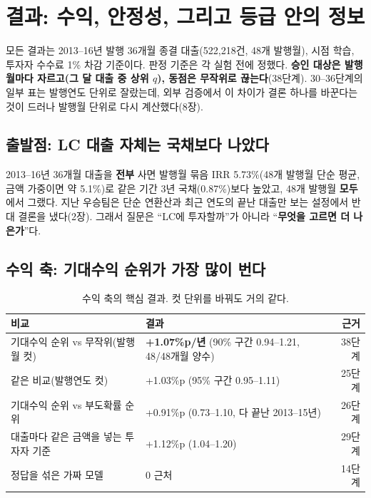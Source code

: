 \chapter{결과: 수익, 안정성, 그리고 등급 안의 정보}

모든 결과는 2013--16년 발행 36개월 종결 대출(522,218건, 48개 발행월), 시점 학습, 투자자 수수료 1\% 차감 기준이다. 판정 기준은 각 실험 전에 정했다. \textbf{승인 대상은 발행월마다 자르고(그 달 대출 중 상위 $q$), 동점은 무작위로 끊는다}(38단계). 30--36단계의 일부 표는 발행연도 단위로 잘랐는데, 외부 검증에서 이 차이가 결론 하나를 바꾼다는 것이 드러나 발행월 단위로 다시 계산했다(8장).

\section{출발점: LC 대출 자체는 국채보다 나았다}
2013--16년 36개월 대출을 \textbf{전부} 사면 발행월 묶음 IRR 5.73\%(48개 발행월 단순 평균, 금액 가중이면 약 5.1\%)로 같은 기간 3년 국채(0.87\%)보다 높았고, 48개 발행월 \textbf{모두}에서 그랬다. 지난 우승팀은 단순 연환산과 최근 연도의 끝난 대출만 보는 설정에서 반대 결론을 냈다(2장). 그래서 질문은 ``LC에 투자할까''가 아니라 ``\textbf{무엇을 고르면 더 나은가}''다.

\section{수익 축: 기대수익 순위가 가장 많이 번다}
\begin{table}[H]\centering\small
\begin{tabular}{@{}llr@{}}\toprule
비교 & 결과 & 근거\\\midrule
기대수익 순위 vs 무작위(발행월 컷) & \textbf{+1.07\%p/년} (90\% 구간 0.94--1.21, 48/48개월 양수) & 38단계\\
같은 비교(발행연도 컷) & +1.03\%p (95\% 구간 0.95--1.11) & 25단계\\
기대수익 순위 vs 부도확률 순위 & +0.91\%p (0.73--1.10, 다 끝난 2013--15년) & 26단계\\
대출마다 같은 금액을 넣는 투자자 기준 & +1.12\%p (1.04--1.20) & 29단계\\
정답을 섞은 가짜 모델 & 0 근처 & 14단계\\\bottomrule
\end{tabular}
\caption{수익 축의 핵심 결과. 컷 단위를 바꿔도 거의 같다.}
\end{table}

